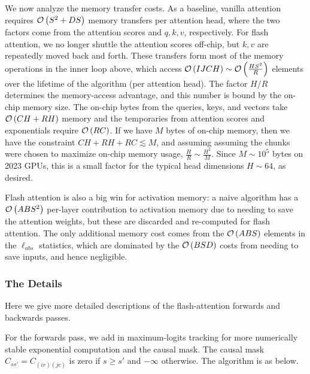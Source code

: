 \documentclass[11pt]{article}
\begin{document}
We now analyze the memory transfer costs. As a baseline, vanilla attention requires $ \mathcal{O} \left( S
^{ 2 }+ DS \right)  $ memory transfers per attention head, where the two factors come from the
attention scores and $ q, k, v $, respectively.  For flash attention, we no longer shuttle the
attention scores off-chip, but $ k, v $ are repeatedly moved back and forth. These transfers form
most of the memory operations in the inner loop above, which access $ \mathcal{O} \left( IJCH \right) \sim
\mathcal{O} \left( \frac{ HS ^{ 2 } }{ R } \right)$ elements over the lifetime of the algorithm (per
attention head). The factor $ H/R $ determines the memory-access advantage, and this number is bound
by the on-chip memory size. The on-chip bytes from the queries, keys, and vectors take $ \mathcal{O}
\left( CH + RH \right)  $ memory and the temporaries from attention scores and exponentials require
$ \mathcal{O} \left( RC \right)$. If we have $ M $ bytes of on-chip memory, then we have the constraint $
CH + RH + RC \lesssim  M  $, and assuming assuming the chunks were chosen to maximize on-chip memory
usage, $ \frac{ H }{ R } \sim \frac{ H ^{ 2 } }{ M } $. Since $ M \sim 10 ^{ 5 } $ bytes on 2023
GPUs, this is a small factor for the typical head dimensions  $ H \sim 64 $, as desired.

Flash attention is also a big win for activation memory: a naive algorithm has a $ \mathcal{O} \left( ABS
^{ 2 } \right)  $ per-layer contribution to activation memory due to needing to save the attention
weights, but these are discarded and re-computed for flash attention.  The only additional memory
cost comes from the $ \mathcal{O} \left( ABS \right)  $ elements in the $ \ell _{ abs } $ statistics, which are
dominated by the $ \mathcal{O} \left( BSD \right)  $ costs from needing to save inputs, and hence negligible.


\subsubsection{The Details \label{subsubsec_fa_details}}

Here we give more detailed descriptions of the flash-attention forwards and backwards passes.

For the forwards pass, we add in maximum-logits tracking for more numerically stable exponential
computation and the causal mask. The causal mask $ C _{ s s' } = C _{ (ir)(jc) } $ is zero if $ s
\ge s' $ and $ -\infty $ otherwise. The algorithm is as below.
\end{document}
